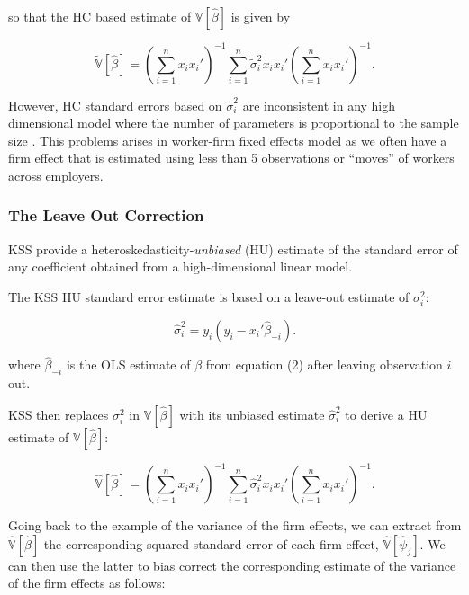 \documentclass[11pt]{article}
\begin{document}
so that the HC based estimate of \(\mathbb{V}[\hat{\beta}]\) is given by

\begin{equation}
\tilde{\mathbb{{V}}}[\hat{\beta}]=\left(\sum_{i=1}^{n}x_{i}x_{i}'\right)^{-1}\sum_{i=1}^{n}\tilde{{\sigma}}^{2}_{i}x_{i}x_{i}'\left(\sum_{i=1}^{n}x_{i}x_{i}'\right)^{-1}.
\end{equation}

However, HC standard errors based on \(\tilde{\sigma}^{2}_{i}\) are
inconsistent in any high dimensional model where the number of
parameters is proportional to the sample size \citep{cattaneo2017inference}. This problems arises in worker-firm fixed effects model  as we often have a firm effect that is estimated using less than
5 observations or ``moves'' of workers across employers.

\hypertarget{the-leave-out-correction}{%
\subsubsection{The Leave Out
Correction}\label{the-leave-out-correction}}

KSS provide a heteroskedasticity-\emph{unbiased} (HU) estimate of the
standard error of any coefficient obtained from a high-dimensional
linear model.

The KSS HU standard error estimate is based on a leave-out estimate of
\(\sigma^{2}_{i}\):

\begin{equation}
\hat{\sigma}^{2}_{i}=y_{i}(y_{i}-x_{i}'\hat{\beta}_{-i}).
\end{equation}

where \(\hat{\beta}_{-i}\) is the OLS estimate of \(\beta\) from
equation (2) after leaving observation \(i\) out.

KSS then replaces \(\sigma^{2}_{i}\) in \(\mathbb{V}[\hat{\beta}]\) with
its unbiased estimate \(\hat{\sigma}^{2}_{i}\) to derive a HU estimate
of \(\mathbb{V}[\hat{\beta}]:\)

\begin{equation}
\hat{\mathbb{{V}}}[\hat{\beta}]=\left(\sum_{i=1}^{n}x_{i}x_{i}'\right)^{-1}\sum_{i=1}^{n}\hat{{\sigma}}^{2}_{i}x_{i}x_{i}'\left(\sum_{i=1}^{n}x_{i}x_{i}'\right)^{-1}.
\end{equation}

Going back to the example of the variance of the firm effects, we can
extract from \(\hat{\mathbb{V}}[\hat{\beta}]\) the corresponding squared
standard error of each firm effect, \(\hat{\mathbb{V}}[\hat{\psi}_{j}]\).
We can then use the latter to bias correct the corresponding estimate of
the variance of the firm effects as follows:
\end{document}
